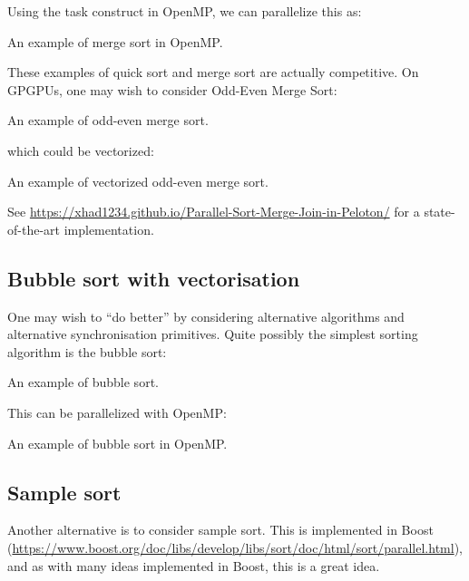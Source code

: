 Using the task construct in OpenMP, we can parallelize this as:

    \begin{codebox}[breakable]{}
        \footnotesize An example of merge sort in OpenMP.
        \tcblower
        \end{codebox}

These examples of quick sort and merge sort are actually competitive. 
 On GPGPUs, one may wish to consider Odd-Even Merge Sort:

 \begin{codebox}[breakable]{}
    \footnotesize An example of odd-even merge sort.
    \tcblower
    \end{codebox}

which could be vectorized:

\begin{codebox}[breakable]{}
    \footnotesize An example of vectorized odd-even merge sort.
    \tcblower
    \end{codebox}

See \url{https://xhad1234.github.io/Parallel-Sort-Merge-Join-in-Peloton/} for a state-of-the-art implementation. 

\subsection{Bubble sort with vectorisation}

One may wish to ``do better'' by considering alternative algorithms and alternative synchronisation primitives. Quite possibly the simplest sorting algorithm is the bubble sort: 

\begin{codebox}[breakable]{}
\footnotesize An example of bubble sort.
\tcblower
{}
\end{codebox}

This can be parallelized with OpenMP:

\begin{codebox}[breakable]{}
\footnotesize An example of bubble sort in OpenMP.
\tcblower
{}
\end{codebox}

\subsection{Sample sort}
 

Another alternative is to consider sample sort. This is implemented in Boost 
(\url{https://www.boost.org/doc/libs/develop/libs/sort/doc/html/sort/parallel.html}), 
and as with many ideas implemented in Boost, this is a great idea. 


